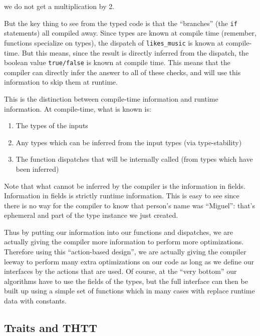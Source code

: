\documentclass[11pt]{article}
\begin{document}
we do not get a multiplication by 2.

    But the key thing to see from the typed code is that the ``branches''
(the \texttt{if} statements) all compiled away. Since types are known at
compile time (remember, functions specialize on types), the dispatch of
\texttt{likes\_music} is known at compile-time. But this means, since
the result is directly inferred from the dispatch, the boolean value
\texttt{true/false} is known at compile time. This means that the
compiler can directly infer the answer to all of these checks, and will
use this information to skip them at runtime.

This is the distinction between compile-time information and runtime
information. At compile-time, what is known is:

\begin{enumerate}
\def\labelenumi{\arabic{enumi})}
\item
  The types of the inputs
\item
  Any types which can be inferred from the input types (via
  type-stability)
\item
  The function dispatches that will be internally called (from types
  which have been inferred)
\end{enumerate}

Note that what cannot be inferred by the compiler is the information in
fields. Information in fields is strictly runtime information. This is
easy to see since there is no way for the compiler to know that person's
name was ``Miguel'': that's ephemeral and part of the type instance we
just created.

Thus by putting our information into our functions and dispatches, we
are actually giving the compiler more information to perform more
optimizations. Therefore using this ``action-based design'', we are
actually giving the compiler leeway to perform many extra optimizations
on our code as long as we define our interfaces by the actions that are
used. Of course, at the ``very bottom'' our algorithms have to use the
fields of the types, but the full interface can then be built up using a
simple set of functions which in many cases with replace runtime data
with constants.

    \subsection{Traits and THTT}\label{traits-and-thtt}
\end{document}
